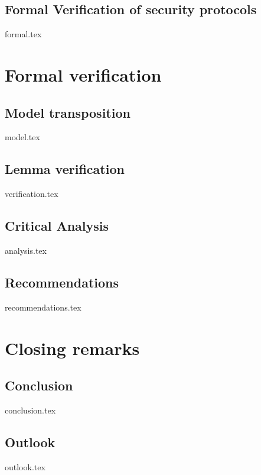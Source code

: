 \documentclass[a4paper,12pt,twoside]{report}
\begin{document}
\section{Formal Verification of security protocols}
\label{sec:method}
{formal.tex}

\clearpage

\chapter{Formal verification}
\label{chap:intro}

\section{Model transposition}
\label{sec:problem}
{model.tex}

\section{Lemma verification}
\label{sec:goal}
{verification.tex}

\section{Critical Analysis}
\label{sec:method}
{analysis.tex}

\section{Recommendations}
\label{sec:method}
{recommendations.tex}

\clearpage

\chapter{Closing remarks}
\label{chap:intro}

\section{Conclusion}
\label{sec:problem}
{conclusion.tex}

\section{Outlook}
\label{sec:goal}
{outlook.tex}

\clearpage

\printbibliography[title={Literature},heading=bibintoc,nottype=online]

\printbibliography[title={Online Sources},heading=bibintoc,type=online]

\clearpage

\appendices
\end{document}
